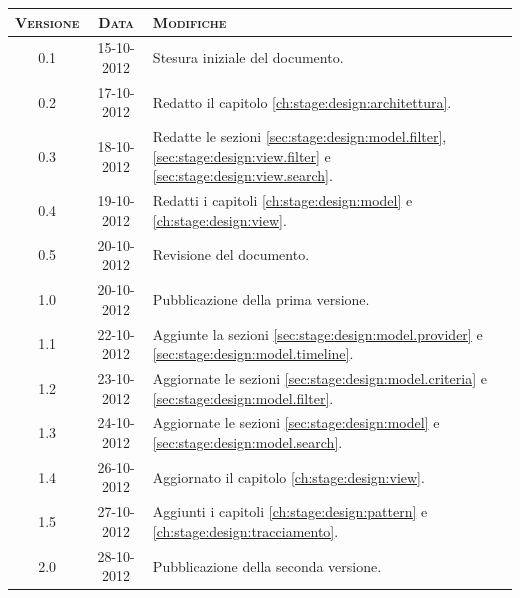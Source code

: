 \documentclass[10pt,a4paper,headinclude,footinclude,hidelinks]{scrreprt} %
\begin{document}
    \title{\rmfamily\normalfont{}}
    \author{}
    \date{\today}
    
    \maketitle
    
    \begin{abstract}
        \noindent Il documento riporta le informazioni di progettazione riguardanti l'interfaccia grafica per la visualizzazione e la navigazione dei contenuti.
    \end{abstract}
    
	\begin{table}[ht]
	\centering
	\begin{tabular}{|c|c|l|}
	\hline
	\textsc{Versione} & \textsc{Data} & \textsc{Modifiche} \\ \hline
	0.1 & 15-10-2012 & Stesura iniziale del documento. \\ \hline
	0.2 & 17-10-2012 & Redatto il capitolo \ref{ch:stage:design:architettura}. \\ \hline
	0.3 & 18-10-2012 & Redatte le sezioni \ref{sec:stage:design:model.filter}, \ref{sec:stage:design:view.filter} e \ref{sec:stage:design:view.search}. \\ \hline
	0.4 & 19-10-2012 & Redatti i capitoli \ref{ch:stage:design:model} e \ref{ch:stage:design:view}. \\ \hline
	0.5 & 20-10-2012 & Revisione del documento. \\ \hline
	1.0 & 20-10-2012 & Pubblicazione della prima versione. \\ \hline
	1.1 & 22-10-2012 & Aggiunte la sezioni \ref{sec:stage:design:model.provider} e \ref{sec:stage:design:model.timeline}. \\ \hline
	1.2 & 23-10-2012 & Aggiornate le sezioni \ref{sec:stage:design:model.criteria} e \ref{sec:stage:design:model.filter}. \\ \hline
	1.3 & 24-10-2012 & Aggiornate le sezioni \ref{sec:stage:design:model} e \ref{sec:stage:design:model.search}. \\ \hline
	1.4 & 26-10-2012 & Aggiornato il capitolo \ref{ch:stage:design:view}. \\ \hline
	1.5 & 27-10-2012 & Aggiunti i capitoli \ref{ch:stage:design:pattern} e \ref{ch:stage:design:tracciamento}. \\ \hline
	2.0 & 28-10-2012 & Pubblicazione della seconda versione. \\ \hline

\end{tabular}
\end{table}
\end{document}
